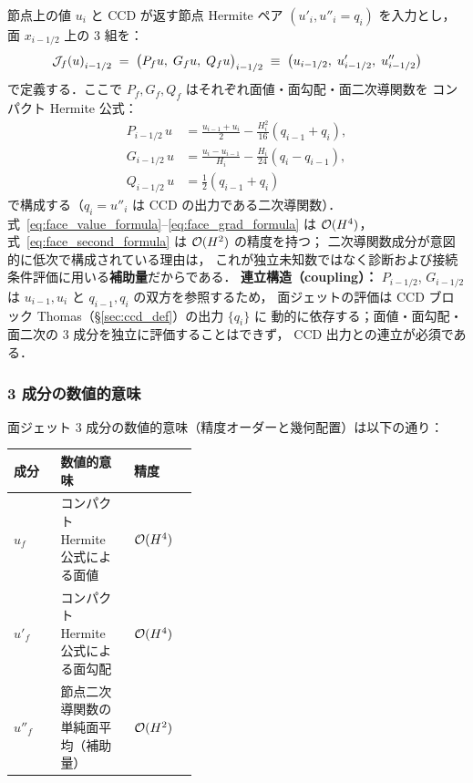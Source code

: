 節点上の値 $u_i$ と CCD が返す節点 Hermite ペア $(u'_i, u''_i = q_i)$ を入力とし，
面 $x_{i-1/2}$ 上の 3 組を：
\begin{equation}
  \mathcal{J}_{f}\!\left(u\right)_{i-1/2}
  \;=\;
  \bigl(P_f u,\; G_f u,\; Q_f u\bigr)_{i-1/2}
  \;\equiv\;
  \bigl(u_{i-1/2},\; u'_{i-1/2},\; u''_{i-1/2}\bigr)
  \label{eq:face_jet_def}
\end{equation}
で定義する．ここで $P_f, G_f, Q_f$ はそれぞれ面値・面勾配・面二次導関数を
コンパクト Hermite 公式：
\begin{align}
  P_{i-1/2}\,u &=
  \frac{u_{i-1}+u_i}{2}
  -\frac{H_i^2}{16}(q_{i-1}+q_i), \label{eq:face_value_formula}\\
  G_{i-1/2}\,u &=
  \frac{u_i-u_{i-1}}{H_i}
  -\frac{H_i}{24}(q_i-q_{i-1}), \label{eq:face_grad_formula}\\
  Q_{i-1/2}\,u &=
  \tfrac{1}{2}(q_{i-1}+q_i) \label{eq:face_second_formula}
\end{align}
で構成する（$q_i = u''_i$ は CCD の出力である二次導関数）．
式~\eqref{eq:face_value_formula}–\eqref{eq:face_grad_formula} は $\mathcal{O}(H^4)$，
式~\eqref{eq:face_second_formula} は $\mathcal{O}(H^2)$ の精度を持つ；
二次導関数成分が意図的に低次で構成されている理由は，
これが独立未知数ではなく診断および接続条件評価に用いる\textbf{補助量}だからである．
\textbf{連立構造（coupling）：}
$P_{i-1/2}$, $G_{i-1/2}$ は $u_{i-1}, u_i$ と $q_{i-1}, q_i$ の双方を参照するため，
面ジェットの評価は CCD ブロック Thomas（§\ref{sec:ccd_def}）の出力 $\{q_i\}$ に
動的に依存する；面値・面勾配・面二次の 3 成分を独立に評価することはできず，
CCD 出力との連立が必須である．

\subsubsection{3 成分の数値的意味}
\label{sec:face_jet_roles}

面ジェット 3 成分の数値的意味（精度オーダーと幾何配置）は以下の通り：

\begin{center}
\begin{tabular}{l p{0.40\linewidth} l}
\hline
\textbf{成分} & \textbf{数値的意味} & \textbf{精度} \\ \hline
$u_f$    & コンパクト Hermite 公式による面値        & $\mathcal{O}(H^4)$ \\
$u'_f$   & コンパクト Hermite 公式による面勾配       & $\mathcal{O}(H^4)$ \\
$u''_f$  & 節点二次導関数の単純面平均（補助量）        & $\mathcal{O}(H^2)$ \\
\hline
\end{tabular}
\end{center}

